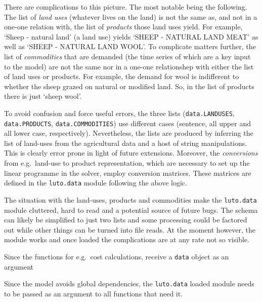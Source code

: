 \documentclass{draft}
\begin{document}
There are complications to this picture. The most notable being the following. The list of \emph{land uses} (whatever lives on the land) is not the same as, and not in a one-one relation with, the list of \emph{products} those land uses yield. For example, `Sheep - natural land' (a land use) yields `SHEEP - NATURAL LAND MEAT' as well as `SHEEP - NATURAL LAND WOOL'. To complicate matters further, the list of \emph{commodities} that are demanded (the time series of which are a key input to the model) are not the same nor in a one-one relationshep with either the list of land uses or products. For example, the demand for wool is indifferent to whether the sheep grazed on natural or modified land. So, in the list of products there is just `sheep wool'.

To avoid confusion and force useful errors, the three lists (\texttt{data.LANDUSES}, \texttt{data.PRODUCTS}, \texttt{data.COMMODITIES}) use different cases (sentence, all upper and all lower case, respectively). Nevertheless, the lists are produced by inferring the list of land-uses from the agricultural data and a host of string manipulations. This is clearly error prone in light of future extensions. Moreover, the \emph{conversions} from e.g.\ land-use to product representation, which are necessary to set up the linear programme in the solver, employ conversion matrices. These matrices are defined in the \texttt{luto.data} module following the above logic.

The situation with the land-uses, products and commodities make the \texttt{luto.data} module cluttered, hard to read and a potential source of future bugs. The schema can likely be simplified to just two lists and some processing could be factored out while other things can be turned into file reads. At the moment however, the module works and once loaded the complications are at any rate not so visible.

Since the functions for e.g.\ cost calculations, receive a \texttt{data} object as an argument %



Since the model avoids global dependencies, the \texttt{luto.data} loaded module needs to be passed as an argument to all functions that need it. 




\end{document}
